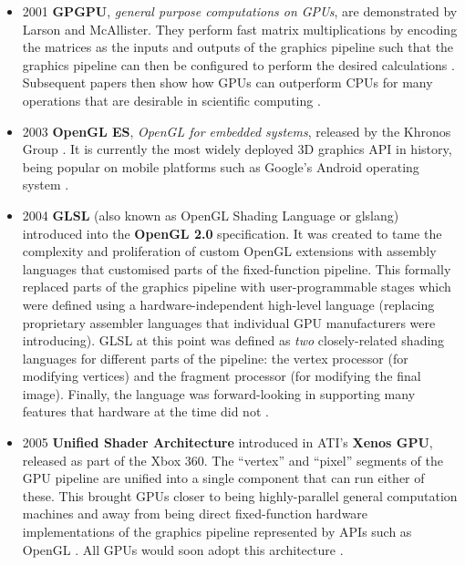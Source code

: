 \documentclass[a4paper,12pt,twoside,openright]{report}
\begin{document}
\begin{itemize}
    \item 2001 \textbf{GPGPU}, \textit{general purpose computations on GPUs},
    are demonstrated by Larson and McAllister. They perform fast matrix
    multiplications by encoding the matrices as the inputs and outputs of the
    graphics pipeline such that the graphics pipeline can then be configured to
    perform the desired calculations \cite{MatrixGPU}. Subsequent papers then
    show how GPUs can outperform CPUs for many operations that are desirable in
    scientific computing \cite{CUDAtoOpenCL} \cite{Kruger03linearalgebra}
    \cite{LUGPU} \cite{SparsematrixGPU}.

    \item 2003 \textbf{OpenGL ES}, \textit{OpenGL for embedded systems},
    released by the Khronos Group \cite{OpenGLESRelease}. It is currently the
    most widely deployed 3D graphics API in history, being popular on mobile
    platforms such as Google's Android operating system \cite{OpenGLES}.

    \item 2004 \textbf{GLSL} (also known as OpenGL Shading Language or glslang)
    introduced into the \textbf{OpenGL 2.0} specification. It was created to
    tame the complexity and proliferation of custom OpenGL extensions with
    assembly languages that customised parts of the fixed-function pipeline.
    This formally replaced parts of the graphics pipeline with
    user-programmable stages which were defined using a hardware-independent
    high-level language (replacing proprietary assembler languages that
    individual GPU manufacturers were introducing). GLSL at this point was
    defined as \textit{two} closely-related shading languages for different
    parts of the pipeline: the vertex processor (for modifying vertices) and
    the fragment processor (for modifying the final image). Finally, the
    language was forward-looking in supporting many features that hardware at
    the time did not \cite{GLSL_1_10}.

    \item 2005 \textbf{Unified Shader Architecture} introduced in ATI's
    \textbf{Xenos GPU}, released as part of the Xbox 360. The ``vertex'' and
    ``pixel'' segments of the GPU pipeline are unified into a single component
    that can run either of these. This brought GPUs closer to being highly-parallel
    general computation machines and away from being direct fixed-function
    hardware implementations of the graphics pipeline represented by APIs such
    as OpenGL \cite{XenosDemystified}. All GPUs would soon adopt this
    architecture \cite{HistoryOfTheGPU}.


\end{itemize}
\end{document}
